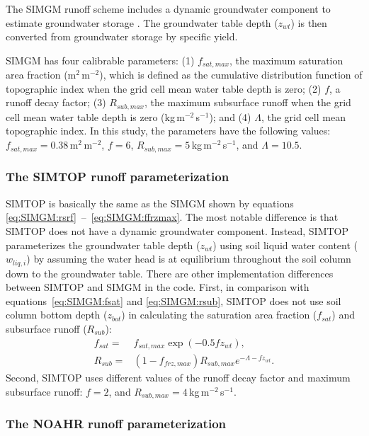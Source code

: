 \documentclass[essd]{copernicus}
\begin{document}
The SIMGM runoff scheme includes a dynamic groundwater component to estimate
groundwater storage \citep{niu2007JGRA}. The groundwater table depth (\(z_{wt}\))
is then converted from groundwater storage by specific yield.

SIMGM has four calibrable parameters: (1) \(f_{sat,max}\), the maximum
saturation area fraction (m$^{2}$\,m$^{-2}$), which is defined as the cumulative
distribution function of topographic index when the grid cell mean water table
depth is zero; (2) \(f\), a runoff decay factor; (3) \(R_{sub,max}\), the
maximum subsurface runoff when the grid cell mean water table depth is zero
(kg\,m$^{-2}$\,s$^{-1}$); and (4) \(\Lambda\), the grid cell mean topographic
index. In this study, the parameters have the following values: \(f_{sat,max} =
0.38\)\,m$^{2}$\,m$^{-2}$, $f=6$, $R_{sub,max} = 5$\,kg\,m$^{-2}$\,s$^{-1}$, and
\(\Lambda = 10.5\).

\subsubsection{The SIMTOP runoff parameterization}

SIMTOP is basically the same as the SIMGM shown by equations
\eqref{eq:SIMGM:rsrf}~--~\eqref{eq:SIMGM:ffrzmax}. The most notable difference
is that SIMTOP does not have a dynamic groundwater component. Instead, SIMTOP
parameterizes the groundwater table depth (\(z_{wt}\)) using soil liquid water
content (\(w_{liq,i}\)) by assuming the water head is at equilibrium throughout
the soil column down to the groundwater table. There are other implementation
differences between SIMTOP and SIMGM in the code. First, in comparison with
equations~\eqref{eq:SIMGM:fsat} and \eqref{eq:SIMGM:rsub}, SIMTOP does not use
soil column bottom depth (\(z_{bot}\)) in calculating the saturation area
fraction (\(f_{sat}\)) and subsurface runoff (\(R_{sub}\)):
\begin{align}
    f_{sat} = & f_{sat,max} \exp(-0.5 f z_{wt}) \text{,} \\
    R_{sub} = & (1-f_{frz,max}) R_{sub,max} e^{-\Lambda-f z_{wt}} \text{.}
\end{align}
Second, SIMTOP uses different values of the runoff decay factor and maximum
subsurface runoff: \(f=2\), and \(R_{sub,max}=4\)\,kg\,m$^{-2}$\,s$^{-1}$.


\subsubsection{The NOAHR runoff parameterization}
\end{document}
